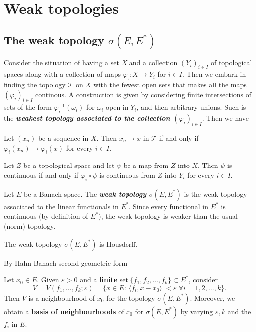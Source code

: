 \documentclass{article}
\theoremstyle{definition}
\numberwithin{equation}{section}
\begin{document}
\section{Weak topologies}
\subsection{The weak topology $\sigma(E,E^*)$}
Consider the situation of having a set $X$ and a collection $(Y_i)_{i\in I}$ of topological spaces along with a collection of maps $\varphi_i:X\to Y_i$ for $i\in I$. Then we embark in finding the topology $\mathcal{T}$ on $X$ with the fewest open sets that makes all the maps $(\varphi_i)_{i\in I}$ continous. A construction is given by considering finite intersections of sets of the form $\varphi_i^{-1}(\omega_i)$ for $\omega_i$ open in $Y_i$, and then arbitrary unions. Such is the \textbf{\textit{weakest topology associated to the collection $(\varphi_i)_{i\in I}$}}. Then we have
\begin{prop}
	Let $(x_n)$ be a sequence in $X$. Then $x_n\to x$ in $\mathcal{T}$ if and only if $\varphi_i(x_n)\to \varphi_i(x)$ for every $i\in I$.
\end{prop}
\begin{prop}\label{prop:universal-property-weak-topology}
	Let $Z$ be a topological space and let $\psi$ be a map from $Z$ into $X$. Then $\psi$ is continuous if and only if $\varphi_i\circ\psi$ is continuous from $Z$ into $Y_i$ for every $i\in I$.
\end{prop}
Let $E$ be a Banach space. The \textbf{\textit{weak topology $\sigma (E,E^*)$}} is the weak topology associated to the linear functionals in $E^*$. Since every functional in $E^*$ is continuous (by definition of $E^*$), the weak topology is weaker than the usual (norm) topology.
\begin{prop}
	The weak topology $\sigma(E,E^*)$ is Housdorff.
\end{prop}
\begin{prop}
	By Hahn-Banach second geometric form.
\end{prop}
\begin{prop}\label{prop:neighbourhoods-weak-topology}
	Let $x_0\in E$. Given $\varepsilon>0$ and a \textbf{finite} set $\{f_1,f_2,\ldots,f_k\}\subset E^*$, consider
	\[V=V(f_1,\ldots,f_k;\varepsilon)=\{x\in E:|\langle f_i,x-x_0\rangle|<\varepsilon\;\forall i=1,2,\ldots,k\}.\]
	Then $V$ is a neighbourhood of $x_0$ for the topology $\sigma(E,E^*)$. Moreover, we obtain a \textbf{basis of neighbourhoods} of $x_0$ for $\sigma(E,E^*)$ by varying $\varepsilon,k$ and the $f_i$ in $E$.
\end{prop}
\end{document}
